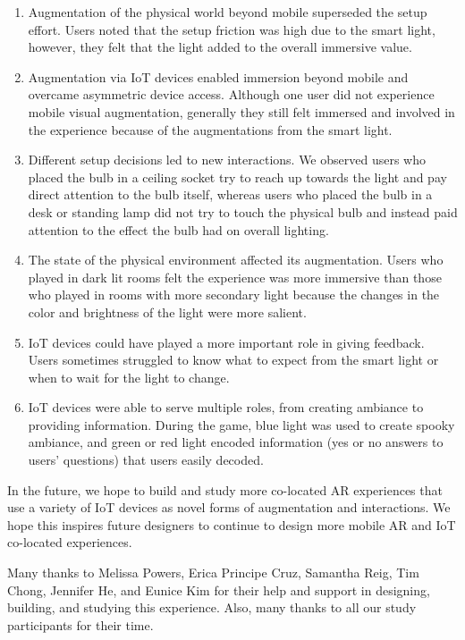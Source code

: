 \documentclass[sigconf, language=french,
language=german, language=spanish, language=english]{acmart}
\begin{document}
\begin{enumerate}
\item  Augmentation of the physical world beyond mobile superseded the setup effort. Users noted that the setup friction
was high due to the smart light, however, they felt that the
light added to the overall immersive value.
\item  Augmentation via IoT devices enabled immersion beyond mobile and overcame asymmetric device access. Although one
user did not experience mobile visual augmentation, generally they still felt immersed and involved in the experience
because of the augmentations from the smart light.
\item  Different setup decisions led to new interactions. We observed
users who placed the bulb in a ceiling socket try to reach up
towards the light and pay direct attention to the bulb itself,
whereas users who placed the bulb in a desk or standing
lamp did not try to touch the physical bulb and instead paid
attention to the effect the bulb had on overall lighting.
\item  The state of the physical environment affected its augmentation. Users who played in dark lit rooms felt the experience
was more immersive than those who played in rooms with
more secondary light because the changes in the color and
brightness of the light were more salient.
\item  IoT devices could have played a more important role in giving feedback. Users sometimes struggled to know what to
expect from the smart light or when to wait for the light to
change.

\item  IoT devices were able to serve multiple roles, from creating
ambiance to providing information. During the game, blue
light was used to create spooky ambiance, and green or
red light encoded information (yes or no answers to users’
questions) that users easily decoded.
\end{enumerate}
In the future, we hope to build and study more co-located AR
experiences that use a variety of IoT devices as novel forms of
augmentation and interactions. We hope this inspires future designers to continue to design more mobile AR and IoT co-located
experiences.




\begin{acks}
Many thanks to Melissa Powers, Erica Principe Cruz, Samantha
Reig, Tim Chong, Jennifer He, and Eunice Kim for their help and support in designing, building, and studying this experience. Also,
many thanks to all our study participants for their time.

\end{acks}



\end{document}
